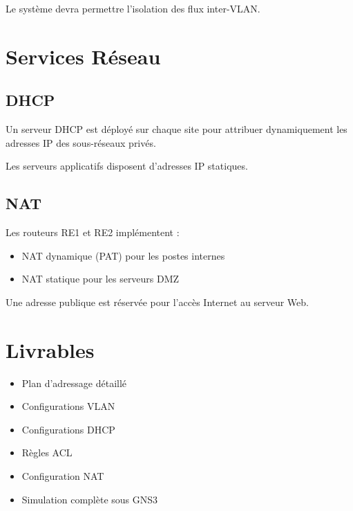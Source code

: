 \documentclass[11pt,a4paper]{article}
\begin{document}
	Le système devra permettre l’isolation des flux inter-VLAN.
	
	\section{Services Réseau}
	
	\subsection{DHCP}
	
	Un serveur DHCP est déployé sur chaque site pour attribuer
	dynamiquement les adresses IP des sous-réseaux privés.
	
	Les serveurs applicatifs disposent d’adresses IP statiques.
	
	\subsection{NAT}
	
	Les routeurs RE1 et RE2 implémentent :
	
	\begin{itemize}
		\item NAT dynamique (PAT) pour les postes internes
		\item NAT statique pour les serveurs DMZ
	\end{itemize}
	
	Une adresse publique est réservée pour l’accès Internet au serveur Web.
	
	\section{Livrables}
	
	\begin{itemize}
		\item Plan d’adressage détaillé
		\item Configurations VLAN
		\item Configurations DHCP
		\item Règles ACL
		\item Configuration NAT
		\item Simulation complète sous GNS3
	\end{itemize}
	
\end{document}
